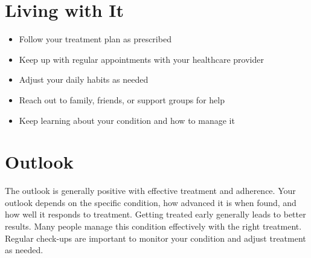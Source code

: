 \section{Living with It}

\begin{itemize}[noitemsep]
  \item Follow your treatment plan as prescribed
  \item Keep up with regular appointments with your healthcare provider
  \item Adjust your daily habits as needed
  \item Reach out to family, friends, or support groups for help
  \item Keep learning about your condition and how to manage it
\end{itemize}

\section{Outlook}
The outlook is generally positive with effective treatment and adherence. Your outlook depends on the specific condition, how advanced it is when found, and how well it responds to treatment. Getting treated early generally leads to better results. Many people manage this condition effectively with the right treatment. Regular check-ups are important to monitor your condition and adjust treatment as needed.
